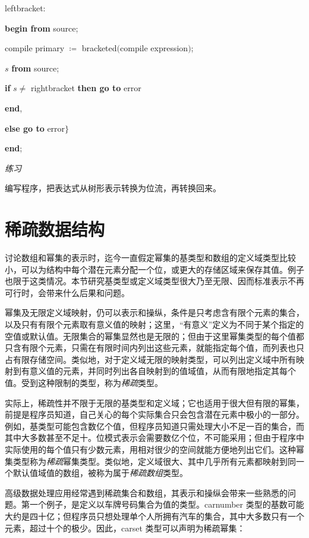 \documentclass[twoside,11pt,fontset=none]{ctexbook}
\begin{document}
\noindent
\quad \quad \quad leftbracket:

\noindent
\quad \quad \quad \textbf{begin from} source;

\noindent
\quad \quad \quad \quad compile primary $\coloneq$ bracketed$($compile expression$)$;

\noindent
\quad \quad \quad \quad $s$ \textbf{from} source;

\noindent
\quad \quad \quad \quad \textbf{if} $s \neq$ rightbracket \textbf{then go to} error

\noindent
\quad \quad \quad \textbf{end},

\noindent
\quad \quad \textbf{else go to} error$\}$

\noindent
\quad \textbf{end};

\noindent
\textit{练习}
\nopagebreak

\noindent
编写程序，把表达式从树形表示转换为位流，再转换回来。
\section[稀疏数据结构]{稀疏数据结构}
\label{sec:sparse-data-structures}

讨论数组和幂集的表示时，迄今一直假定幂集的基类型和数组的定义域类型比较小，可以为结构中每个潜在元素分配一个位，或更大的存储区域来保存其值。例子也限于这类情况。本节研究基类型或定义域类型很大乃至无限、因而标准表示不再可行时，会带来什么后果和问题。

幂集及无限定义域映射，仍可以表示和操纵，条件是只考虑含有限个元素的集合，以及只有有限个元素取有意义值的映射；这里，“有意义”定义为不同于某个指定的空值或默认值。无限集合的幂集显然也是无限的；但由于这里幂集类型的每个值都只含有限个元素，只需在有限时间内列出这些元素，就能指定每个值，而列表也只占有限存储空间。类似地，对于定义域无限的映射类型，可以列出定义域中所有映射到有意义值的元素，并同时列出各自映射到的值域值，从而有限地指定其每个值。受到这种限制的类型，称为\textit{稀疏}类型。

实际上，稀疏性并不限于无限的基类型和定义域；它也适用于很大但有限的幂集，前提是程序员知道，自己关心的每个实际集合只会包含潜在元素中极小的一部分。例如，基类型可能包含数亿个值，但程序员知道只需处理大小不足一百的集合，而其中大多数甚至不足十。位模式表示会需要数亿个位，不可能采用；但由于程序中实际使用的每个值只有少数元素，用相对很少的空间就能方便地列出它们。这种幂集类型称为\textit{稀疏}幂集类型。类似地，定义域很大、其中几乎所有元素都映射到同一个默认值域值的数组，被称为属于\textit{稀疏数组}类型。

高级数据处理应用经常遇到稀疏集合和数组，其表示和操纵会带来一些熟悉的问题。第一个例子，是定义以车牌号码集合为值的类型。carnumber 类型的基数可能大约是四十亿；但程序员只想处理单个人所拥有汽车的集合，其中大多数只有一个元素，超过十个的极少。因此，carset 类型可以声明为稀疏幂集：
\end{document}
